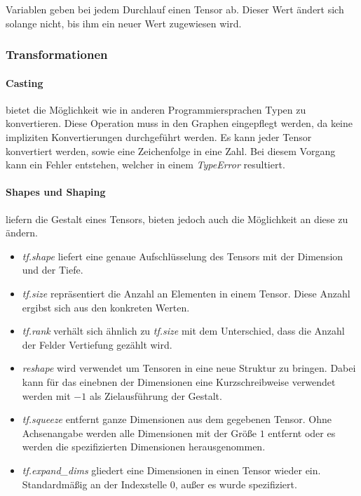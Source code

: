 Variablen geben bei jedem Durchlauf einen Tensor ab.
Dieser Wert ändert sich solange nicht, bis ihm ein neuer Wert zugewiesen wird. 

\subsubsection{Transformationen}

\paragraph{Casting} bietet die Möglichkeit wie in anderen Programmiersprachen Typen zu konvertieren. 
Diese Operation muss in den Graphen eingepflegt werden, da keine impliziten Konvertierungen durchgeführt werden. 
Es kann jeder Tensor konvertiert werden, sowie eine Zeichenfolge in eine Zahl. 
Bei diesem Vorgang kann ein Fehler entstehen, welcher in einem \textit{TypeError} resultiert.

\paragraph{Shapes und Shaping} liefern die Gestalt eines Tensors, bieten jedoch auch die Möglichkeit an diese zu ändern. 
\begin{itemize}
	\item \textit{tf.shape} liefert eine genaue Aufschlüsselung des Tensors mit der Dimension und der Tiefe.
	\item \textit{tf.size} repräsentiert die Anzahl an Elementen in einem Tensor. 
	Diese Anzahl ergibst sich aus den konkreten Werten.
	\item \textit{tf.rank} verhält sich ähnlich zu \textit{tf.size} mit dem Unterschied, dass die Anzahl der Felder Vertiefung gezählt wird.
	\item \textit{reshape} wird verwendet um Tensoren in eine neue Struktur zu bringen. 
	Dabei kann für das einebnen der Dimensionen eine Kurzschreibweise verwendet werden mit $-1$ als Zielausführung der Gestalt.
	\item \textit{tf.squeeze} entfernt ganze Dimensionen aus dem gegebenen Tensor. 
	Ohne Achsenangabe werden alle Dimensionen mit der Größe $1$ entfernt oder es werden die spezifizierten Dimensionen herausgenommen.
	\item \textit{tf.expand\_dims} gliedert eine Dimensionen in einen Tensor wieder ein. 
	Standardmäßig an der Indexstelle $0$, außer es wurde spezifiziert.
\end{itemize}

